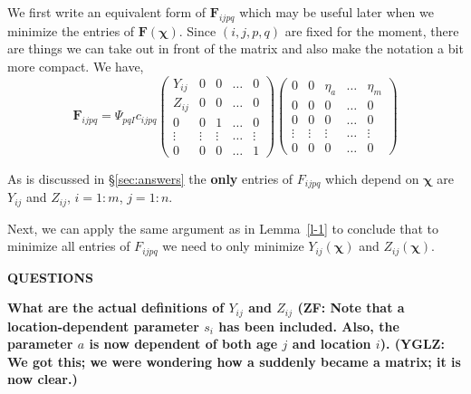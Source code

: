 \documentclass[12pt]{amsart}
\theoremstyle{definition}
\begin{document}
We first write an equivalent form of $\bm F_{ijpq}$  which may be useful later when we minimize the entries of $\bm F(\bm \chi)$.
Since $(i,j,p,q)$ are fixed for the moment, there are things we can take out in front of the matrix and also make the notation a bit more compact. We have,
\begin{equation}\label{f-ijpq-2}
\bm{F}_{ijpq}=
\Psi_{pqI}c_{ijpq}
\begin{pmatrix}
Y_{ij} & 0 &  0 & \ldots & 0\\
Z_{ij} & 0  & 0 & \ldots & 0\\
0 & 0 &  1 & \ldots & 0\\
\vdots & \vdots &  \vdots & \ldots & \vdots\\
0 & 0 &  0 & \ldots & 1
\end{pmatrix}
\begin{pmatrix}
0 & 0 &  \eta_{a} & \ldots & \eta_{m}\\
0 & 0 &  0 & \ldots & 0\\
0 & 0 &  0 & \ldots & 0\\
\vdots & \vdots &  \vdots & \ldots & \vdots\\
0 & 0 &  0 & \ldots & 0
\end{pmatrix}
\end{equation}

As is discussed in \S\ref{sec:answers} the {\bf only} entries of $F_{ijpq}$ which depend on $\bm \chi$ are $Y_{ij}$ and $Z_{ij}$, $i=1:m$, $j=1:n$. 

Next, we can apply the same argument as in Lemma~\ref{l-1} to conclude that to minimize all entries of $F_{ijpq}$ we need to only minimize 
$Y_{ij}(\bm \chi)$ and $Z_{ij}(\bm \chi)$. 

\noindent\hrulefill

\centerline{{\bf QUESTIONS}}

\noindent\hrulefill

{\bf What are the actual definitions of $Y_{ij}$ and $Z_{ij}$ {\color{red}(ZF: Note that a location-dependent parameter $s_i$ has been included. Also, the parameter $a$ is now dependent of both age $j$ and location $i$)}. 
{\color{magenta} (YGLZ: We got this; we were wondering how a suddenly became a matrix; it is now clear.)}
}%
\end{document}
